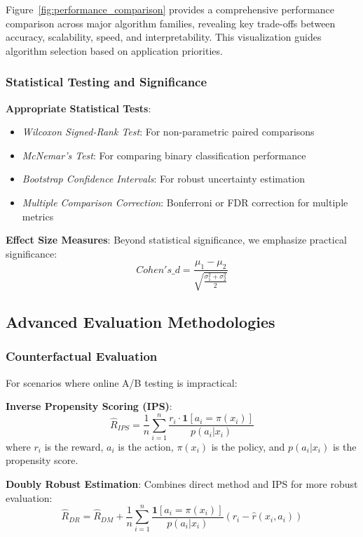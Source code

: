 Figure~\ref{fig:performance_comparison} provides a comprehensive performance comparison across major algorithm families, revealing key trade-offs between accuracy, scalability, speed, and interpretability. This visualization guides algorithm selection based on application priorities.

\subsubsection{Statistical Testing and Significance}

\textbf{Appropriate Statistical Tests}:
\begin{itemize}
    \item \textit{Wilcoxon Signed-Rank Test}: For non-parametric paired comparisons
    \item \textit{McNemar's Test}: For comparing binary classification performance
    \item \textit{Bootstrap Confidence Intervals}: For robust uncertainty estimation
    \item \textit{Multiple Comparison Correction}: Bonferroni or FDR correction for multiple metrics
\end{itemize}

\textbf{Effect Size Measures}:
Beyond statistical significance, we emphasize practical significance:
\begin{equation}
Cohen's\_d = \frac{\mu_1 - \mu_2}{\sqrt{\frac{\sigma_1^2 + \sigma_2^2}{2}}}
\end{equation}

\subsection{Advanced Evaluation Methodologies}

\subsubsection{Counterfactual Evaluation}
For scenarios where online A/B testing is impractical:

\textbf{Inverse Propensity Scoring (IPS)}:
\begin{equation}
\hat{R}_{IPS} = \frac{1}{n}\sum_{i=1}^n \frac{r_i \cdot \mathbf{1}[a_i = \pi(x_i)]}{p(a_i|x_i)}
\end{equation}
where $r_i$ is the reward, $a_i$ is the action, $\pi(x_i)$ is the policy, and $p(a_i|x_i)$ is the propensity score.

\textbf{Doubly Robust Estimation}:
Combines direct method and IPS for more robust evaluation:
\begin{equation}
\hat{R}_{DR} = \hat{R}_{DM} + \frac{1}{n}\sum_{i=1}^n \frac{\mathbf{1}[a_i = \pi(x_i)]}{p(a_i|x_i)}(r_i - \hat{r}(x_i, a_i))
\end{equation}

